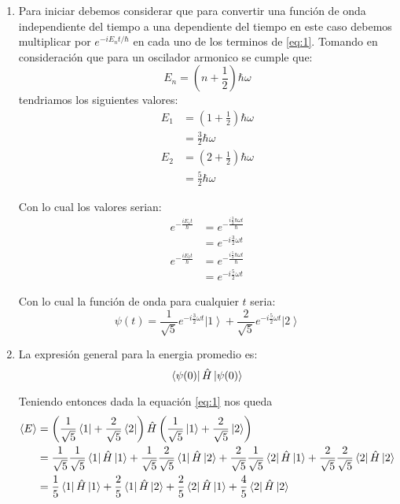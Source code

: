 \documentclass[12pt]{exam}
\begin{document}
\begin{enumerate}
	\item
		Para iniciar debemos considerar que para convertir una función de onda independiente del tiempo a una dependiente del tiempo en este caso debemos multiplicar por $e^{-iE_nt/\hbar}$ en cada uno de los terminos de \ref{eq:1}. Tomando en consideración que para un oscilador armonico se cumple que: \[E_n = \left(n + \frac{1}{2}\right)\hbar\omega\] tendriamos los siguientes valores:
		\begin{align}
			E_{1} &= \left(1 + \frac{1}{2}\right)\hbar\omega\nonumber\\
			&= \frac{3}{2}\hbar\omega\label{eq:e1}\\
			E_2 &= \left(2 + \frac{1}{2}\right)\hbar\omega\nonumber\\
			&= \frac{5}{2}\hbar\omega\label{eq:e2}
		\end{align}
	
		Con lo cual los valores serian:
		\begin{align*}
			e^{-\frac{iE_1t}{\hbar}} &= e^{-\frac{i\frac{3}{2}\hbar\omega t}{\hbar}}\\
			&= e^{-i\frac{3}{2}\omega t}\\
			e^{-\frac{iE_2t}{\hbar}} &= e^{-\frac{i\frac{5}{2}\hbar\omega t}{\hbar}}\\
			&= e^{-i\frac{5}{2}\omega t}
		\end{align*}

		Con lo cual la función de onda para cualquier $t$ seria:
		\begin{equation}
			\psi(t) = \frac{1}{\sqrt{5}}e^{-i\frac{3}{2}\omega t}\left|1\right> + \frac{2}{\sqrt{5}} e^{-i\frac{5}{2}\omega t}\left| 2\right> \label{eq:res_1a}
		\end{equation}
	\item 
		La expresión general para la energia promedio es:
		\begin{equation}
			\left<\psi(0)\right|\hat{H}\left|\psi(0)\right>\label{eq:E_med}
		\end{equation}

		Teniendo entonces dada la equación \ref{eq:1} nos queda
		\begin{align}
			\left<E\right> &= \left(\frac{1}{\sqrt{5}}\left<1\right| + \frac{2}{\sqrt{5}}\left<2\right|\right)\hat{H}\left(\frac{1}{\sqrt{5}}\left|1\right> + \frac{2}{\sqrt{5}}\left|2\right>\right)\nonumber\\
			&= \frac{1}{\sqrt{5}}\frac{1}{\sqrt{5}}\left<1\right|\hat{H}\left|1\right> +
			\frac{1}{\sqrt{5}}\frac{2}{\sqrt{5}}\left<1\right|\hat{H}\left|2\right> +
			\frac{2}{\sqrt{5}}\frac{1}{\sqrt{5}}\left<2\right|\hat{H}\left|1\right> +
			\frac{2}{\sqrt{5}}\frac{2}{\sqrt{5}}\left<2\right|\hat{H}\left|2\right>\nonumber\\
			&= \frac{1}{5}\left<1\right|\hat{H}\left|1\right> +
			\frac{2}{5}\left<1\right|\hat{H}\left|2\right> +
			\frac{2}{5}\left<2\right|\hat{H}\left|1\right> +
			\frac{4}{5}\left<2\right|\hat{H}\left|2\right>\label{eq:med_1}
		\end{align}


\end{enumerate}
\end{document}
